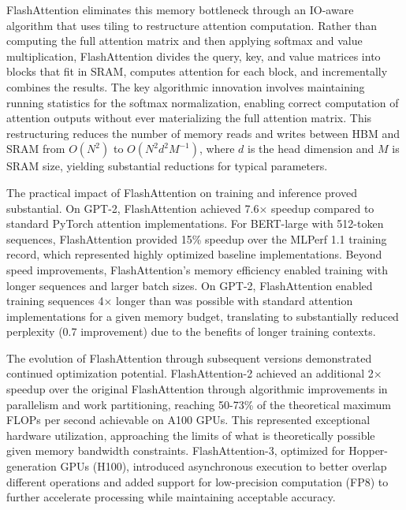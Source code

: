 FlashAttention eliminates this memory bottleneck through an IO-aware algorithm that uses tiling to restructure attention computation. Rather than computing the full attention matrix and then applying softmax and value multiplication, FlashAttention divides the query, key, and value matrices into blocks that fit in SRAM, computes attention for each block, and incrementally combines the results. The key algorithmic innovation involves maintaining running statistics for the softmax normalization, enabling correct computation of attention outputs without ever materializing the full attention matrix. This restructuring reduces the number of memory reads and writes between HBM and SRAM from $O(N^2)$ to $O(N^2 d^2 M^{-1})$, where $d$ is the head dimension and $M$ is SRAM size, yielding substantial reductions for typical parameters.

The practical impact of FlashAttention on training and inference proved substantial. On GPT-2, FlashAttention achieved 7.6$\times$ speedup compared to standard PyTorch attention implementations. For BERT-large with 512-token sequences, FlashAttention provided 15\% speedup over the MLPerf 1.1 training record, which represented highly optimized baseline implementations. Beyond speed improvements, FlashAttention's memory efficiency enabled training with longer sequences and larger batch sizes. On GPT-2, FlashAttention enabled training sequences 4$\times$ longer than was possible with standard attention implementations for a given memory budget, translating to substantially reduced perplexity (0.7 improvement) due to the benefits of longer training contexts.

The evolution of FlashAttention through subsequent versions demonstrated continued optimization potential. FlashAttention-2 \citep{dao2023flashattention2} achieved an additional 2$\times$ speedup over the original FlashAttention through algorithmic improvements in parallelism and work partitioning, reaching 50-73\% of the theoretical maximum FLOPs per second achievable on A100 GPUs. This represented exceptional hardware utilization, approaching the limits of what is theoretically possible given memory bandwidth constraints. FlashAttention-3, optimized for Hopper-generation GPUs (H100), introduced asynchronous execution to better overlap different operations and added support for low-precision computation (FP8) to further accelerate processing while maintaining acceptable accuracy.

